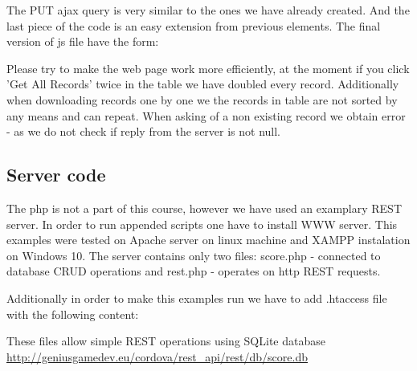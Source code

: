 The PUT ajax query is very similar to the ones we have already created. And the last piece of the code is an easy extension from previous elements. The final version of js file have the form:




\begin{extercises}
  Please try to make the web page work more efficiently, at the moment if you click 'Get All Records' twice in the table we have doubled every record. Additionally when downloading records one by one we the records in table are not sorted by any means and can repeat.  When asking of a non existing record we obtain error -  as we do not check if reply from the server is not null.
\end{extercises}

 \subsection{Server code}
 The php is not a part of this course, however we have used an examplary REST server. In order to run appended scripts one have to install WWW server. This examples were tested on Apache server on linux machine and XAMPP instalation on Windows 10. The server contains only two files: score.php - connected to database CRUD operations and rest.php - operates on http REST requests.



 Additionally in order to make this examples run we have to add .htaccess file with the following content:


 These files allow simple REST operations using SQLite database \url{http://geniusgamedev.eu/cordova/rest_api/rest/db/score.db}


